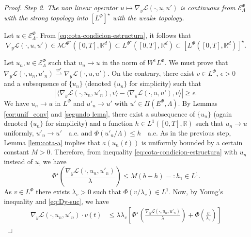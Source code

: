 \documentclass[twoside]{article}
\theoremstyle{remark}
\newcommand{\lphi}{L^{\Phi}}
\newcommand{\lpsi}{L^{\Phi^{\star}}}
\newcommand{\ephi}{E^{\Phi}}
\newcommand{\wphi}{W^{1}\lphi}
\newcommand{\domi}{\mathcal{E}^{\Phi}}
\newcommand{\rr}{\mathbb{R}}
\renewcommand{\leq}{\leqslant}
\renewcommand{\geq}{\geqslant}
\begin{document}
\begin{proof}
\noindent\emph{Step 2. The non linear operator   $u
 \mapsto  \nabla_y\mathcal{L}(\cdot,u,u')$ is continuous from $\domi_{\Lambda}$ with the strong topology  
into $\left[\lphi\right]^{\star}$  with the weak$\star$ topology.}

 Let $u\in \domi_{\Lambda}$.  From  \eqref{eq:cota-condicion-estructura}, it follows that 
\begin{equation}\label{eq:DyLpsi-clase}
\nabla_y\mathcal{L}(\cdot,u,u')\in \lambda C^{\Phi^{\star}}\left([0,T],\rr^d\right)\subset\lpsi\left([0,T],\rr^d\right)\subset\left[\lphi\left([0,T],\rr^d\right)\right]^{\star}.
\end{equation}






Let $u_n,u\in \domi_{\Lambda}$ such that $u_n\to u$ in the norm of $\wphi$. 
We must prove that  $\nabla_y\mathcal{L}(\cdot,u_n,u'_n)\overset{w^\star}{\rightharpoonup} 
\nabla_y\mathcal{L}(\cdot,u,u')$. 
On the contrary, there exist $v\in\lphi$, $\epsilon>0$ and a subsequence of $\{u_n\}$ (denoted  $\{u_n\}$ for simplicity)  such that
\begin{equation}\label{cota_eps}
 \left| \langle \nabla_y\mathcal{L}(\cdot,u_n,u'_n),v \rangle - 
\langle  \nabla_y\mathcal{L}(\cdot,u,u'),v \rangle\right|\geq \epsilon.
\end{equation}
We have $u_n\rightarrow u$ in $\lphi$ and
$u'_n\rightarrow u'$ with $u'\in\Pi(\ephi,\Lambda)$.
 By Lemmas \ref{cor:unif_conv}  and \ref{segundo lema}, there exist a subsequence of $\{u_n\}$ (again denoted  $\{u_n\}$ for simplicity) 
and a function $h\in L^1([0,T],\rr)$ such that 
$u_n\rightarrow u$ uniformly, $u'_n\rightarrow u' \quad\text{a.e.}$ and $\Phi(u'_n/\Lambda)\leq h\quad\text{a.e.}$ 
As in the previous step,
Lemma \ref{lem:cota-a} implies that $a(u_n(t))$ is uniformly bounded by a certain constant $M>0$. 
Therefore,   from inequality  \eqref{eq:cota-condicion-estructura} with $u_n$ instead of $u$, we have 
\begin{equation}\label{eq:Dy-suc}
  \Phi^{\star}\left(\frac{\nabla_y\mathcal{L}(\cdot,u_n,u'_n)}{\lambda}\right)   
	\leq M (b+h)=:h_1\in L^1.
\end{equation}
As $v \in \lphi$ there exists $\lambda_v>0$ such that $\Phi(v/\lambda_v)\in L^1$. 
Now, by Young's inequality and \eqref{eq:Dy-suc}, we have
\begin{equation}\label{eq:Dy_lambda-Psi}
\begin{split}
\nabla_y\mathcal{L}(\cdot,u_{n},u'_{n})\cdot v(t)
&\leq 
\lambda\lambda_v\left[\Phi^{\star}\left(\frac{\nabla_y\mathcal{L}(\cdot,u_{n},u'_{n})}{\lambda}\right)+\Phi\left(\frac{v}{\lambda_v}\right)\right]

\end{split}
\end{equation}
\end{proof}
\end{document}
